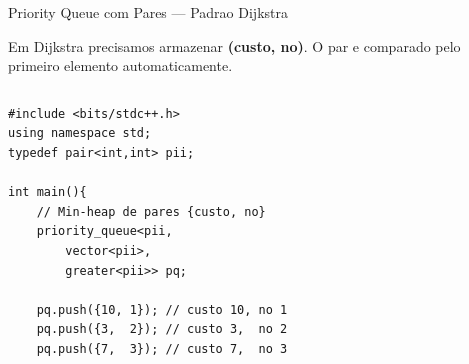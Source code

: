 \documentclass[aspectratio=169,10pt]{beamer}
\begin{document}
\begin{frame}[fragile,shrink=3]{Priority Queue com Pares --- Padrao Dijkstra}
  \begin{tcolorbox}[caixaAmarelo,title={Por que usar pares?}]
    \footnotesize
    Em Dijkstra precisamos armazenar \textbf{(custo, no)}.
    O par e comparado pelo primeiro elemento automaticamente.
  \end{tcolorbox}
  \vspace{0.06cm}
  \begin{columns}[t]
      \begin{tcolorbox}[caixaCodigo]
        \begin{lstlisting}[style=cppsmall]
#include <bits/stdc++.h>
using namespace std;
typedef pair<int,int> pii;

int main(){
    // Min-heap de pares {custo, no}
    priority_queue<pii,
        vector<pii>,
        greater<pii>> pq;

    pq.push({10, 1}); // custo 10, no 1
    pq.push({3,  2}); // custo 3,  no 2
    pq.push({7,  3}); // custo 7,  no 3


\end{lstlisting}
\end{tcolorbox}
\end{columns}
\end{frame}
\end{document}
